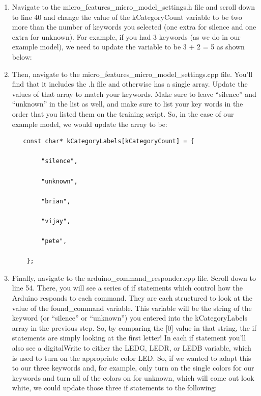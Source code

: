 \begin{enumerate}
  \item  Navigate to the micro\_features\_micro\_model\_settings.h file and scroll down to line 40 and change the value of the kCategoryCount variable to be two more than the number of keywords you selected (one extra for silence and one extra for unknown). For example, if you had 3 keywords (as we do in our example model), we need to update the variable to be 3 + 2 = 5 as shown below:
 
    
  \item  Then, navigate to the micro\_features\_micro\_model\_settings.cpp file. You’ll find that it includes the .h file and otherwise has a single array. Update the values of   that array to match your keywords. Make sure to leave “silence” and “unknown” in the list as well, and make sure to list your key words in the order   that you listed them on the training script. So, in the case of our example model, we would update the array to be:
  
  \begin{lstlisting}
   const char* kCategoryLabels[kCategoryCount] = {
        
        "silence",
        
        "unknown",
        
        "brian",
        
        "vijay",
        
        "pete",
        
    };
  \end{lstlisting} 
    
  \item  Finally, navigate to the arduino\_command\_responder.cpp file. Scroll down to line 54. There, you will see a series of if statements which control how the Arduino responds to each command. They are each structured to look at the value of the found\_command variable. This variable will be the string of the keyword (or “silence” or “unknown”) you entered into the kCategoryLabels array in the previous step. So, by comparing the [0] value in that string, the if statements are simply looking at the first letter! In each if statement you’ll also see a digitalWrite to either the LEDG, LEDR, or LEDB variable, which is used to turn on the appropriate color LED. So, if we wanted to adapt this to our three keywords and, for example, only turn on the single colors for our keywords and turn all of the colors on for unknown, which will come out look white, we could update those three if statements to the following:


\end{enumerate}

